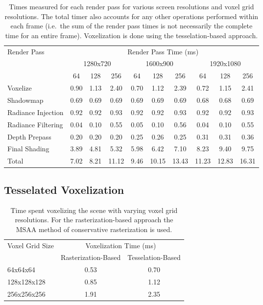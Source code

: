 \begin{table}[H]
\centering
\begin{tabular}{l ccc ccc ccc}
\toprule
Render Pass & \multicolumn{9}{c}{Render Pass Time (ms)} \\
& \multicolumn{3}{c}{1280x720} & \multicolumn{3}{c}{1600x900} & \multicolumn{3}{c}{1920x1080} \\
& 64 & 128 & 256 & 64 & 128 & 256 & 64 & 128 & 256 \\
\midrule
Voxelize           & 0.90 & 1.13 & 2.40  & 0.70 & 1.12 & 2.39  & 0.72 & 1.15 & 2.41\\
Shadowmap          & 0.69 & 0.69 & 0.69  & 0.69 & 0.69 & 0.69  & 0.68 & 0.68 & 0.69\\
Radiance Injection & 0.92 & 0.92 & 0.93  & 0.92 & 0.92 & 0.93  & 0.92 & 0.92 & 0.93\\
Radiance Filtering & 0.04 & 0.10 & 0.55  & 0.05 & 0.10 & 0.56  & 0.04 & 0.10 & 0.55\\
Depth Prepass      & 0.20 & 0.20 & 0.20  & 0.25 & 0.26 & 0.25  & 0.31 & 0.31 & 0.36\\
Final Shading      & 3.89 & 4.81 & 5.32  & 5.98 & 6.42 & 7.10  & 8.23 & 9.40 & 9.75\\
\midrule
Total              & 7.02 & 8.21 & 11.12  & 9.46 & 10.15 & 13.43  & 11.23 & 12.83 & 16.31\\
\bottomrule
\end{tabular}
\caption{Times measured for each render pass for various screen resolutions and voxel grid resolutions. The total timer also accounts for any other operations performed within each frame (i.e.\ the sum of the render pass times is not necessarily the complete time for an entire frame). Voxelization is done using the tesselation-based approach.}
\label{tbl:renderpasstiming}
\end{table}

\subsection{Tesselated Voxelization}

\begin{table}[H]
\centering
\begin{tabular}{lcc}
\toprule
\multirow{2}{*}{Voxel Grid Size} & \multicolumn{2}{c}{Voxelization Time (ms)} \\
& Rasterization-Based & Tesselation-Based \\
\midrule
64x64x64        & 0.53 & 0.70\\
128x128x128     & 0.85 & 1.12\\
256x256x256     & 1.91 & 2.35\\
\bottomrule
\end{tabular}
\caption{Time spent voxelizing the scene with varying voxel grid resolutions. For the rasterization-based approach the MSAA method of conservative rasterization is used.}
\label{tbl:voxelizationtiming}
\end{table}

